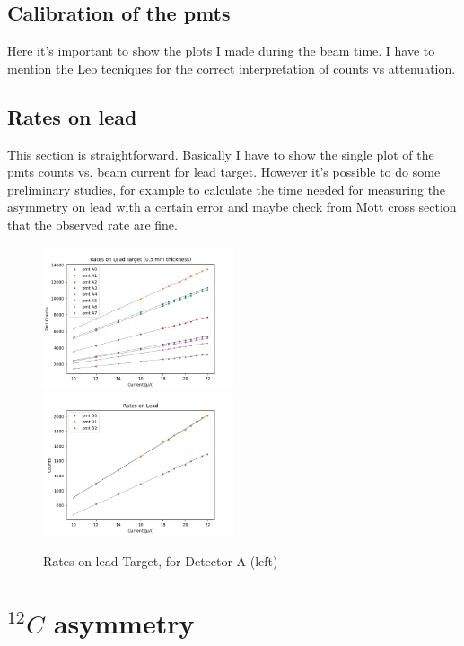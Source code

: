 \subsection{Calibration of the pmts}

Here it's important to show the plots I made during the beam time. I have to mention the Leo tecniques for the correct interpretation of counts vs attenuation.  

\subsection{Rates on lead}

This section is straightforward. Basically I have to show the single plot of the pmts counts vs. beam current for lead target. However it's possible to do some preliminary studies, for example to calculate the time needed for measuring the asymmetry on lead with a certain error and maybe check from Mott cross section that the observed rate are fine. 

\begin{figure}[hbtp]
\centering
\includegraphics[width = 0.5\textwidth]{Analysis/Rates_on_lead.png}
\includegraphics[width = 0.5\textwidth]{Analysis/Rates_on_leadB.png}
\caption{Rates on lead Target, for Detector A (left)}
\end{figure}

\section{ $^{12}C$ asymmetry}

